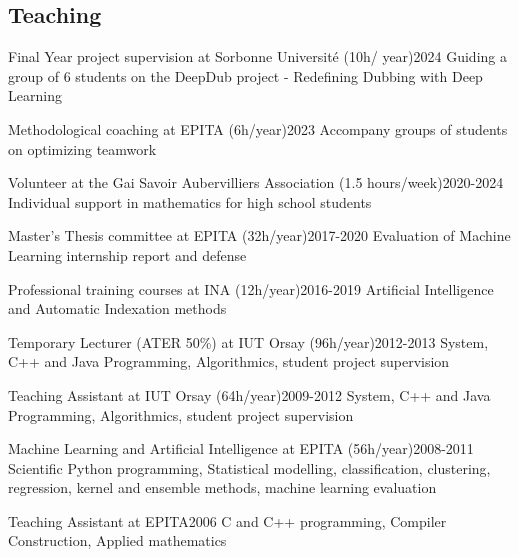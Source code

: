 \begin{en}
\subsection{Teaching}

\begin{jobshort}{Final Year project supervision at Sorbonne Université (10h/ year)}{2024}
Guiding a group of 6 students on the DeepDub project - Redefining Dubbing with Deep Learning
\end{jobshort}

\begin{jobshort}{Methodological coaching at EPITA (6h/year)}{2023}
Accompany groups of students on optimizing teamwork
\end{jobshort}

\begin{jobshort}{Volunteer at the Gai Savoir Aubervilliers Association (1.5 hours/week)}{2020-2024}
Individual support in mathematics for high school students
\end{jobshort}

\begin{jobshort}{Master's Thesis committee at EPITA (32h/year)}{2017-2020}
Evaluation of Machine Learning internship report and defense
\end{jobshort}

\begin{jobshort}{Professional training courses at INA (12h/year)}{2016-2019}
Artificial Intelligence and Automatic Indexation methods
\end{jobshort}

\begin{jobshort}{Temporary Lecturer (ATER 50\%) at IUT Orsay (96h/year)}{2012-2013}
System, C++ and Java Programming, Algorithmics, student project supervision
\end{jobshort}

\begin{jobshort}{Teaching Assistant at IUT Orsay (64h/year)}{2009-2012}
System, C++ and Java Programming, Algorithmics, student project supervision
\end{jobshort}

\begin{jobshort}{Machine Learning and Artificial Intelligence at EPITA (56h/year)}{2008-2011}
Scientific Python programming, Statistical modelling, classification, clustering, regression, kernel and ensemble methods, machine learning evaluation
\end{jobshort}

\begin{jobshort}{Teaching Assistant at EPITA}{2006}
C and C++ programming, Compiler Construction, Applied mathematics
\end{jobshort}

\end{en}


